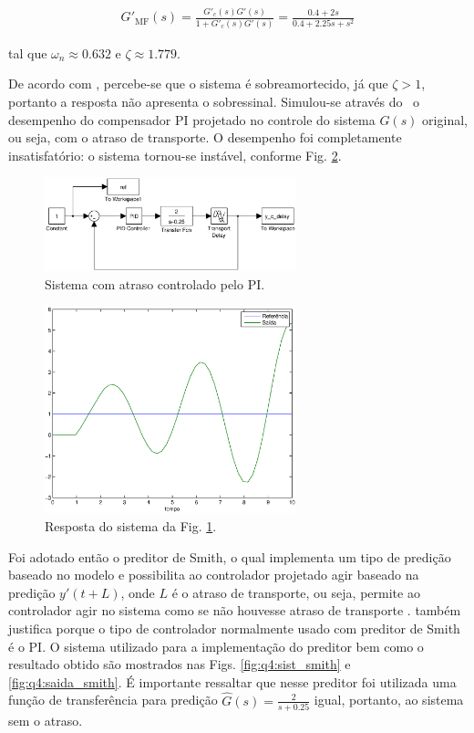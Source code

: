 \begin{eqnarray}
G'_{\text{MF}}(s) = \frac{G'_c(s)G'(s)}{1+G'_c(s)G'(s)} =
                    \frac{0.4+2s}{0.4+2.25s+s^{2}}
\end{eqnarray}

\noindent tal que $\omega_n \approx 0.632$ e $\zeta \approx 1.779$.

De acordo com , percebe-se que o sistema é sobreamortecido,
já que $\zeta > 1$, portanto a resposta não apresenta o sobressinal. Simulou-se
através do \Simulink\ o desempenho do compensador PI projetado no controle
do sistema $G(s)$ original, ou seja, com o atraso de transporte. O desempenho
foi completamente insatisfatório: o sistema tornou-se instável, conforme Fig.
\ref{fig:q4:saida_cont_dt}. 

\begin{figure}[htb]
\centering
\includegraphics[width=0.65\textwidth]{imgs/questao4/sist_cont_dt}
\caption{Sistema com atraso controlado pelo PI.}
\label{fig:q4:sist_cont_dt}
\end{figure}

\begin{figure}[htb]
\centering
\includegraphics[width=0.65\textwidth]{imgs/questao4/saida_cont_dt}
\caption{Resposta do sistema da Fig. \ref{fig:q4:sist_cont_dt}.}
\label{fig:q4:saida_cont_dt}
\end{figure}

Foi adotado então o preditor de Smith, o qual implementa um tipo de predição
baseado no modelo e possibilita ao controlador projetado agir baseado na
predição $y'(t + L)$, onde $L$ é o atraso de transporte, ou seja, permite ao
controlador agir no sistema como se não houvesse atraso de transporte
\cite{Haegglund1996}.  também justifica porque o tipo
de controlador normalmente usado com preditor de Smith é o PI. O sistema
utilizado para a implementação do preditor bem como o resultado obtido são
mostrados nas Figs. \ref{fig:q4:sist_smith} e \ref{fig:q4:saida_smith}. É
importante ressaltar que nesse preditor foi utilizada uma função de
transferência para predição $\hat{G}(s) = \frac{2}{s+0.25}$ igual, portanto, ao
sistema sem o atraso.

